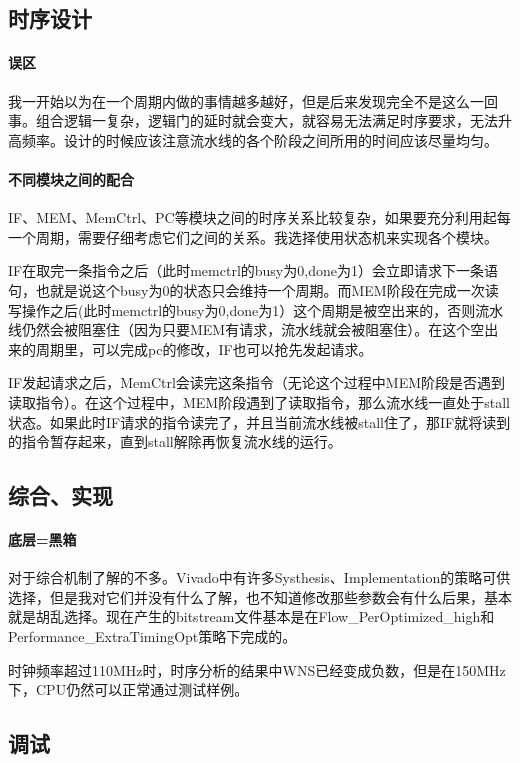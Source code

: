 \documentclass[UTF8]{ctexart}
\begin{document}
	\subsection{时序设计}
		\paragraph{误区} 我一开始以为在一个周期内做的事情越多越好，但是后来发现完全不是这么一回事。组合逻辑一复杂，逻辑门的延时就会变大，就容易无法满足时序要求，无法升高频率。设计的时候应该注意流水线的各个阶段之间所用的时间应该尽量均匀。
		
		
		\paragraph{不同模块之间的配合} IF、MEM、MemCtrl、PC等模块之间的时序关系比较复杂，如果要充分利用起每一个周期，需要仔细考虑它们之间的关系。我选择使用状态机来实现各个模块。
		
		IF在取完一条指令之后（此时memctrl的busy为0,done为1）会立即请求下一条语句，也就是说这个busy为0的状态只会维持一个周期。而MEM阶段在完成一次读写操作之后(此时memctrl的busy为0,done为1）这个周期是被空出来的，否则流水线仍然会被阻塞住（因为只要MEM有请求，流水线就会被阻塞住）。在这个空出来的周期里，可以完成pc的修改，IF也可以抢先发起请求。
		
		IF发起请求之后，MemCtrl会读完这条指令（无论这个过程中MEM阶段是否遇到读取指令）。在这个过程中，MEM阶段遇到了读取指令，那么流水线一直处于stall状态。如果此时IF请求的指令读完了，并且当前流水线被stall住了，那IF就将读到的指令暂存起来，直到stall解除再恢复流水线的运行。
		


	\subsection{综合、实现}
		\paragraph{底层=黑箱} 对于综合机制了解的不多。Vivado中有许多Systhesis、Implementation的策略可供选择，但是我对它们并没有什么了解，也不知道修改那些参数会有什么后果，基本就是胡乱选择。现在产生的bitstream文件基本是在Flow\_PerOptimized\_high和Performance\_ExtraTimingOpt策略下完成的。
	
		时钟频率超过110MHz时，时序分析的结果中WNS已经变成负数，但是在150MHz下，CPU仍然可以正常通过测试样例。
	
	\subsection{调试}
\end{document}
